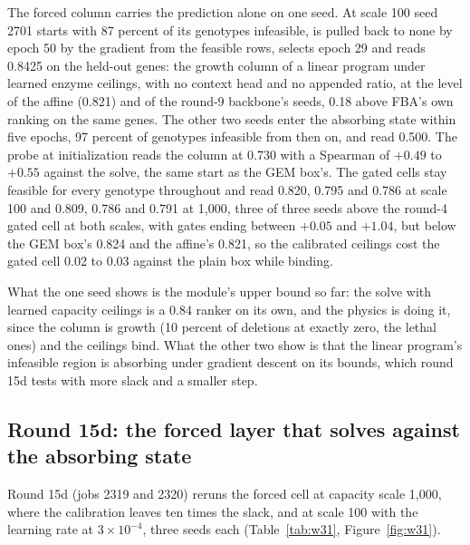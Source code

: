 The forced column carries the prediction alone on one seed. At scale 100 seed 2701
starts with 87 percent of its genotypes infeasible, is pulled back to none by epoch 50
by the gradient from the feasible rows, selects epoch 29 and reads 0.8425 on the
held-out genes: the growth column of a linear program under learned enzyme ceilings,
with no context head and no appended ratio, at the level of the affine (0.821) and of
the round-9 backbone's seeds, 0.18 above FBA's own ranking on the same genes. The other
two seeds enter the absorbing state within five epochs, 97 percent of genotypes
infeasible from then on, and read 0.500. The probe at initialization reads the column at
0.730 with a Spearman of $+0.49$ to $+0.55$ against the solve, the same start as the
GEM box's. The gated cells stay feasible for every genotype throughout and read 0.820,
0.795 and 0.786 at scale 100 and 0.809, 0.786 and 0.791 at 1,000, three of three seeds
above the round-4 gated cell at both scales, with gates ending between $+0.05$ and
$+1.04$, but below the GEM box's 0.824 and the affine's 0.821, so the calibrated
ceilings cost the gated cell 0.02 to 0.03 against the plain box while binding.

What the one seed shows is the module's upper bound so far: the solve with learned
capacity ceilings is a 0.84 ranker on its own, and the physics is doing it, since the
column is growth (10 percent of deletions at exactly zero, the lethal ones) and the
ceilings bind. What the other two show is that the linear program's infeasible region
is absorbing under gradient descent on its bounds, which round 15d tests with more slack
and a smaller step.

\subsection{Round 15d: the forced layer that solves against the absorbing state}

Round 15d (jobs 2319 and 2320) reruns the forced cell at capacity scale 1,000, where
the calibration leaves ten times the slack, and at scale 100 with the learning rate at
$3 \times 10^{-4}$, three seeds each (Table~\ref{tab:w31}, Figure~\ref{fig:w31}).




